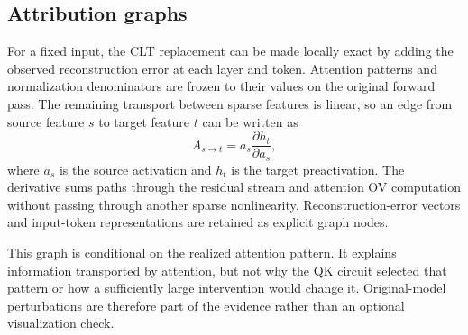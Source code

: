 \subsection{Attribution graphs}

For a fixed input, the CLT replacement can be made locally exact by adding the observed reconstruction error at each layer and token. Attention patterns and normalization denominators are frozen to their values on the original forward pass. The remaining transport between sparse features is linear, so an edge from source feature $s$ to target feature $t$ can be written as
\begin{equation}
    A_{s\rightarrow t}=a_s\frac{\partial h_t}{\partial a_s},
\end{equation}
where $a_s$ is the source activation and $h_t$ is the target preactivation. The derivative sums paths through the residual stream and attention OV computation without passing through another sparse nonlinearity. Reconstruction-error vectors and input-token representations are retained as explicit graph nodes.

This graph is conditional on the realized attention pattern. It explains information transported by attention, but not why the QK circuit selected that pattern or how a sufficiently large intervention would change it. Original-model perturbations are therefore part of the evidence rather than an optional visualization check.
